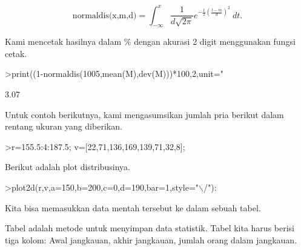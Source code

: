 \documentclass[a4paper,10pt]{article}
\begin{document}
\begin{eulernotebook}
\begin{eulercomment}
\begin{eulercomment}
\begin{eulercomment}
\begin{eulercomment}
\begin{eulercomment}
\begin{eulercomment}
\begin{eulercomment}
\begin{eulercomment}
\begin{eulercomment}
\begin{eulercomment}
\begin{eulercomment}
\begin{eulercomment}
\begin{eulercomment}
\begin{eulercomment}
\begin{eulercomment}
\begin{eulercomment}
\begin{eulercomment}
\begin{eulercomment}
\begin{eulercomment}
\end{eulercomment}
\begin{eulerformula}
\[
\text{normaldis(x,m,d)}=\int_{-\infty}^x \frac{1}{d\sqrt{2\pi}}e^{-\frac{1}{2 }(\frac{t-m}{d})^2}\ dt.
\]
\end{eulerformula}
\begin{eulercomment}
Kami mencetak hasilnya dalam \% dengan akurasi 2 digit menggunakan
fungsi cetak.
\end{eulercomment}
\begin{eulerprompt}
>print((1-normaldis(1005,mean(M),dev(M)))*100,2,unit=" %
\end{eulerprompt}
\begin{euleroutput}
        3.07 %
\end{euleroutput}
\begin{eulercomment}
Untuk contoh berikutnya, kami mengasumsikan jumlah pria berikut dalam
rentang ukuran yang diberikan.
\end{eulercomment}
\begin{eulerprompt}
>r=155.5:4:187.5; v=[22,71,136,169,139,71,32,8];
\end{eulerprompt}
\begin{eulercomment}
Berikut adalah plot distribusinya.
\end{eulercomment}
\begin{eulerprompt}
>plot2d(r,v,a=150,b=200,c=0,d=190,bar=1,style="\(\backslash\)/"):
\end{eulerprompt}
\begin{eulercomment}
Kita bisa memasukkan data mentah tersebut ke dalam sebuah tabel.

Tabel adalah metode untuk menyimpan data statistik. Tabel kita harus
berisi tiga kolom: Awal jangkauan, akhir jangkauan, jumlah orang dalam
jangkauan.


\end{eulercomment}
\end{eulercomment}
\end{eulercomment}
\end{eulercomment}
\end{eulercomment}
\end{eulercomment}
\end{eulercomment}
\end{eulercomment}
\end{eulercomment}
\end{eulercomment}
\end{eulercomment}
\end{eulercomment}
\end{eulercomment}
\end{eulercomment}
\end{eulercomment}
\end{eulercomment}
\end{eulercomment}
\end{eulercomment}
\end{eulercomment}
\end{eulernotebook}
\end{document}
